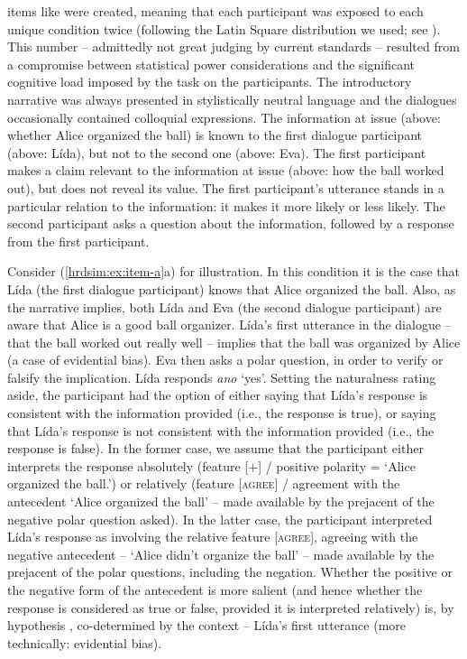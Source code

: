\documentclass[output=paper,colorlinks,citecolor=brown]{langscibook}
\begin{document}
 items like  were created, meaning that each participant was exposed to each unique condition twice (following the Latin Square distribution we used; see ). This number -- admittedly not great judging by current standards \citep{Haussler.Juzek2017} -- resulted from a compromise between statistical power considerations and the significant cognitive load imposed by the task on the participants. The introductory narrative was always presented in stylistically neutral language and the dialogues occasionally contained colloquial expressions. The information at issue (above: whether Alice organized the ball) is known to the first dialogue participant (above: Lída), but not to the second one (above: Eva). The first participant makes a claim relevant to the information at issue (above: how the ball worked out), but does not reveal its value. The first participant's utterance stands in a particular relation to the information: it makes it more likely or less likely. The second participant asks a question about the information, followed by a response from the first participant.

Consider (\ref{hrdsim:ex:item-a}a) for illustration. In this condition it is the case that Lída (the first dialogue participant) knows that Alice organized the ball. Also, as the narrative implies, both Lída and Eva (the second dialogue participant) are aware that Alice is a good ball organizer. Lída's first utterance in the dialogue -- that the ball worked out really well -- implies that the ball was organized by Alice (a case of evidential bias). Eva then asks a polar question, in order to verify or falsify the implication. Lída responds \textit{ano} `yes'. Setting the naturalness rating aside, the participant had the option of either saying that Lída's response is consistent with the information provided (i.e., the response is true), or saying that Lída's response is not consistent with the information provided (i.e., the response is false). In the former case, we assume that the participant either interprets the response absolutely (feature [$+$] / positive polarity = `Alice organized the ball.') or relatively (feature [\textsc{agree}] / agreement with the antecedent `Alice organized the ball' -- made available by the prejacent of the negative polar question asked). In the latter case, the participant interpreted Lída's response as involving the relative feature [\textsc{agree}], agreeing with the negative antecedent -- `Alice didn't organize the ball' -- made available by the prejacent of the polar questions, including the negation. Whether the positive or the negative form of the antecedent is more salient (and hence whether the response is considered as true or false, provided it is interpreted relatively) is, by hypothesis \citep{hrd+:krifka13}, co-determined by the context -- Lída's first utterance (more technically: evidential bias).
\end{document}
